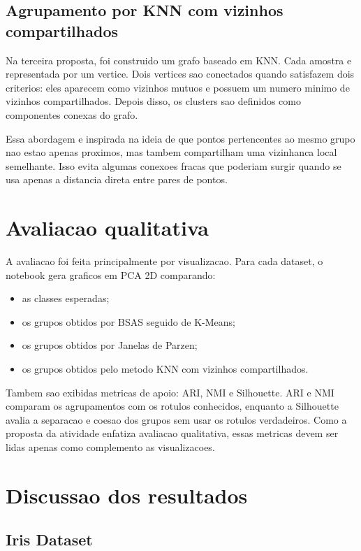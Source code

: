 \documentclass[12pt,a4paper]{article}
\begin{document}
\subsection{Agrupamento por KNN com vizinhos compartilhados}

Na terceira proposta, foi construido um grafo baseado em KNN. Cada amostra e
representada por um vertice. Dois vertices sao conectados quando satisfazem dois
criterios: eles aparecem como vizinhos mutuos e possuem um numero minimo de
vizinhos compartilhados. Depois disso, os clusters sao definidos como
componentes conexas do grafo.

Essa abordagem e inspirada na ideia de que pontos pertencentes ao mesmo grupo
nao estao apenas proximos, mas tambem compartilham uma vizinhanca local
semelhante. Isso evita algumas conexoes fracas que poderiam surgir quando se usa
apenas a distancia direta entre pares de pontos.

\section{Avaliacao qualitativa}

A avaliacao foi feita principalmente por visualizacao. Para cada dataset, o
notebook gera graficos em PCA 2D comparando:

\begin{itemize}[leftmargin=1.5cm]
    \item as classes esperadas;
    \item os grupos obtidos por BSAS seguido de K-Means;
    \item os grupos obtidos por Janelas de Parzen;
    \item os grupos obtidos pelo metodo KNN com vizinhos compartilhados.
\end{itemize}

Tambem sao exibidas metricas de apoio: ARI, NMI e Silhouette. ARI e NMI comparam
os agrupamentos com os rotulos conhecidos, enquanto a Silhouette avalia a
separacao e coesao dos grupos sem usar os rotulos verdadeiros. Como a proposta
da atividade enfatiza avaliacao qualitativa, essas metricas devem ser lidas
apenas como complemento as visualizacoes.

\section{Discussao dos resultados}

\subsection{Iris Dataset}
\end{document}
